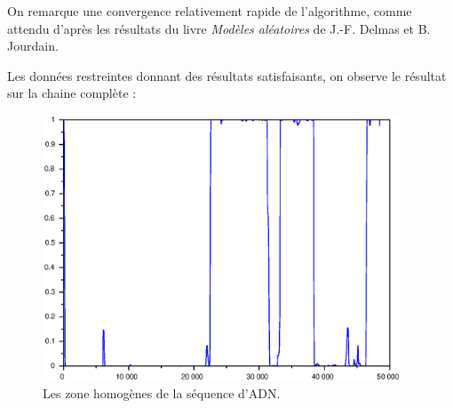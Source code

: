 \documentclass[12pt,a4paper]{article}
\begin{document}
On remarque une convergence relativement rapide de l'algorithme, comme attendu d'après les résultats du livre \emph{Modèles aléatoires} de J.-F. Delmas et B. Jourdain.

Les données restreintes donnant des résultats satisfaisants, on observe le résultat sur la chaine complète :

\begin{figure}[H]
	\centering
	\includegraphics[width=0.95\textwidth]{images/figure6.eps}
	\caption{Les zone homogènes de la séquence d'\textsc{ADN}.}
\end{figure}
\end{document}
